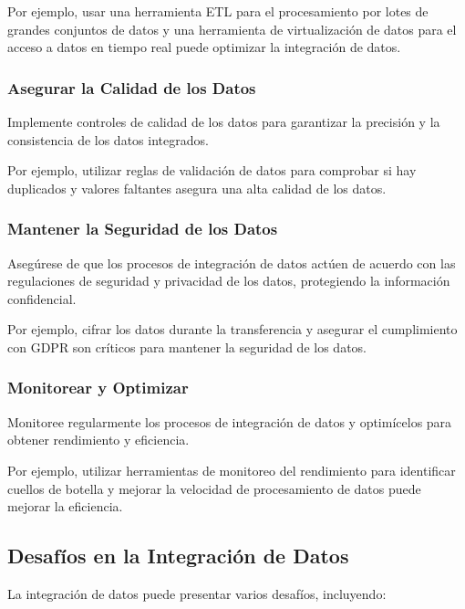 \documentclass[12pt]{book}
\begin{document}
Por ejemplo, usar una herramienta ETL para el procesamiento por lotes de grandes conjuntos de datos y una herramienta de virtualización de datos para el acceso a datos en tiempo real puede optimizar la integración de datos.

\subsubsection{Asegurar la Calidad de los Datos}
Implemente controles de calidad de los datos para garantizar la precisión y la consistencia de los datos integrados.

Por ejemplo, utilizar reglas de validación de datos para comprobar si hay duplicados y valores faltantes asegura una alta calidad de los datos.

\subsubsection{Mantener la Seguridad de los Datos}
Asegúrese de que los procesos de integración de datos actúen de acuerdo con las regulaciones de seguridad y privacidad de los datos, protegiendo la información confidencial.

Por ejemplo, cifrar los datos durante la transferencia y asegurar el cumplimiento con GDPR son críticos para mantener la seguridad de los datos.

\subsubsection{Monitorear y Optimizar}
Monitoree regularmente los procesos de integración de datos y optimícelos para obtener rendimiento y eficiencia.

Por ejemplo, utilizar herramientas de monitoreo del rendimiento para identificar cuellos de botella y mejorar la velocidad de procesamiento de datos puede mejorar la eficiencia.

\subsection{Desafíos en la Integración de Datos}
La integración de datos puede presentar varios desafíos, incluyendo:
\end{document}
